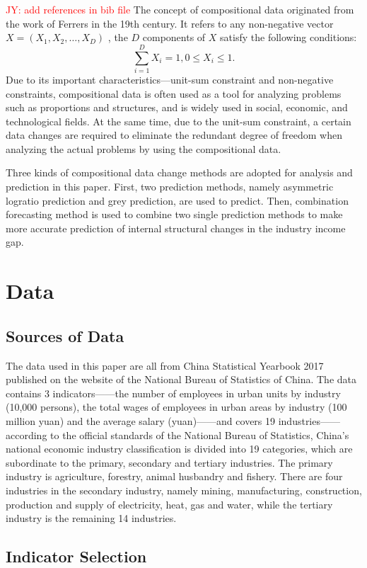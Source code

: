 \documentclass[12pt, titlepage]{article}
\newcommand{\red}[1]{{\textcolor{red}{#1}}}
\begin{document}
\red{JY: add references in bib file}
The concept of compositional data originated from the work of Ferrers in the 19th century. It refers to any non-negative vector $X=(X_{1},X_{2},\ldots,X_{D})$ , the $D$ components of $X$ satisfy the following conditions: $$\sum_{i=1}^DX_{i}=1,0\leq X_{i}\leq 1.$$
Due to its important characteristics—unit-sum constraint and
non-negative constraints, compositional data is often used as a tool
for analyzing problems such as proportions and structures, and is
widely used in social, economic, and technological fields. At the same
time, due to the unit-sum constraint, a certain data changes are
required to eliminate the redundant degree of freedom when analyzing
the actual problems by using the compositional data.


Three kinds of compositional data change methods are adopted for
analysis and prediction in this paper. First, two prediction methods,
namely asymmetric logratio prediction and grey prediction, are used to
predict. Then, combination forecasting method is used to combine two
single prediction methods to make more accurate prediction of internal
structural changes in the industry income gap.

\section{Data}
\subsection{Sources of Data}
The data used in this paper are all from China Statistical Yearbook 2017 published on the website of the National Bureau of Statistics of China. The data contains 3 indicators——the number of employees in urban units by industry (10,000 persons), the total wages of employees in urban areas by industry (100 million yuan) and the average salary (yuan)——and covers 19 industries——according to the official standards of the National Bureau of Statistics, China's national economic industry classification is divided into 19 categories, which are subordinate to the primary, secondary and tertiary industries. 
The primary industry is agriculture, forestry, animal husbandry and fishery. There are four industries in the secondary industry, namely mining, manufacturing,  construction, production and supply of electricity, heat, gas and water, while the tertiary industry is the remaining 14 industries.

\subsection{Indicator Selection}
\end{document}
